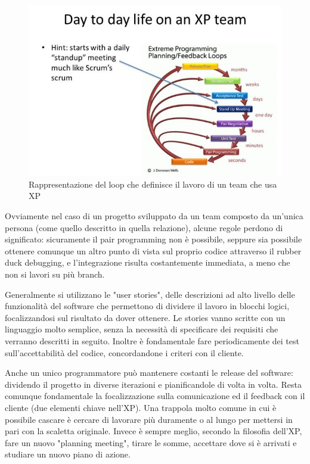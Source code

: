 \documentclass[12pt]{article}
\begin{document}
\begin{figure}[H]
\centering
\includegraphics[scale=.5]{XP}
\caption{Rappresentazione del loop che definisce il lavoro di un team che usa XP}
\label{img:XP}
\end{figure}

Ovviamente nel caso di un progetto sviluppato da un team composto da un'unica persona (come quello descritto in quella relazione), alcune regole perdono di significato: sicuramente il pair programming non è possibile, seppure sia possibile ottenere comunque un altro punto di vista sul proprio codice attraverso il rubber duck debugging, e l'integrazione risulta costantemente immediata, a meno che non si lavori su più branch.

Generalmente si utilizzano le "user stories", delle descrizioni ad alto livello delle funzionalità del software che permettono di dividere il lavoro in blocchi logici, focalizzandosi sul risultato da dover ottenere. Le stories vanno scritte con un linguaggio molto semplice, senza la necessità di specificare dei requisiti che verranno descritti in seguito. Inoltre è fondamentale fare periodicamente dei test sull'accettabilità del codice, concordandone i criteri con il cliente.

Anche un unico programmatore può mantenere costanti le release del software: dividendo il progetto in diverse iterazioni e pianificandole di volta in volta. Resta comunque fondamentale la focalizzazione sulla comunicazione ed il feedback con il cliente (due elementi chiave nell'XP). Una trappola molto comune in cui è possibile cascare è cercare di lavorare più duramente o al lungo per mettersi in pari con la scaletta originale. Invece è sempre meglio, secondo la filosofia dell'XP, fare un nuovo "planning meeting", tirare le somme, accettare dove si è arrivati e studiare un nuovo piano di azione.
\end{document}
